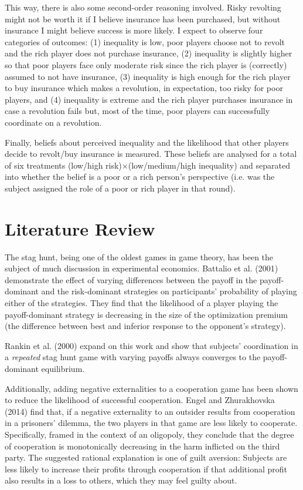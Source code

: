 \documentclass[12pt]{article}
\begin{document}
	This way, there is also some second-order reasoning involved. Risky 
	revolting might not be worth it if I believe insurance has been purchased, 
	but without insurance I might believe success is more likely.
	I expect to observe four categories of outcomes: (1) inequality is low, 
	poor players choose not to revolt and the rich player does not purchase 
	insurance, (2) inequality is slightly higher so that poor players face only 
	moderate risk since the rich player is (correctly) assumed to not have 
	insurance, (3) inequality is high enough for the rich player to buy 
	insurance which makes a revolution, in expectation, too risky for poor 
	players, and (4) inequality is extreme and the rich player purchases 
	insurance in case a revolution fails but, most of the time, poor players 
	can successfully coordinate on a revolution.
	
	Finally, beliefs about perceived inequality and the likelihood that other 
	players decide to revolt/buy insurance is measured. These beliefs are 
	analysed for a total of six treatments (low/high 
	risk)$\times$(low/medium/high inequality) and separated into whether the 
	belief is a poor or a rich person's perspective (i.e. was the subject 
	assigned the role of a poor or rich player in that round).
	
	\section{Literature Review}
	The stag hunt, being one of the oldest games in game theory, has been the 
	subject of much discussion in experimental economics. Battalio et al. 
	(2001) demonstrate the effect of varying differences between the payoff in 
	the payoff-dominant and the risk-dominant strategies on participants' 
	probability of playing either of the strategies. They find that the 
	likelihood of a player playing the payoff-dominant strategy is decreasing 
	in the size of the optimization premium (the difference between best and 
	inferior response to the opponent's strategy).
	
	
	Rankin et al. (2000) expand on this work and show that subjects' 
	coordination in a \emph{repeated} stag hunt game with varying payoffs 
	always converges to the payoff-dominant equilibrium.
	
	Additionally, adding negative externalities to a cooperation game has been 
	shown to reduce the likelihood of successful cooperation. Engel and 
	Zhurakhovska (2014) find that, if a negative externality to an outsider 
	results from cooperation in a prisoners' dilemma, the two players in that 
	game are less likely to cooperate. Specifically, framed in the context of 
	an oligopoly, they conclude that the degree of cooperation is monotonically 
	decreasing in the harm inflicted on the third party. The suggested rational 
	explanation is one of guilt aversion: Subjects are less likely to increase 
	their profits through cooperation if that additional profit also results in 
	a loss to others, which they may feel guilty about.
	
\end{document}
